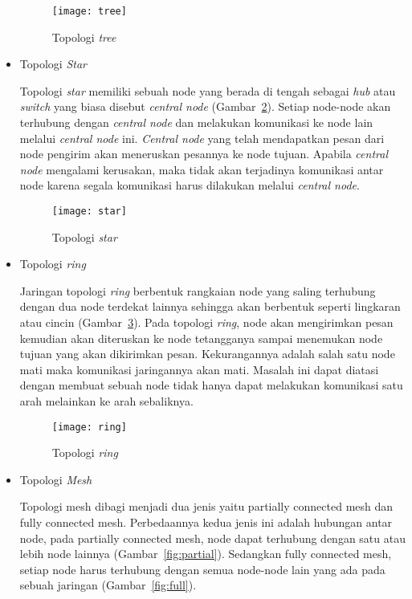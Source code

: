 \begin{itemize}
	\begin{figure}[H] 
		\centering  
		\texttt{[image: tree]}  
		\caption[Topologi \textit{tree}]{Topologi \textit{tree}}
		\label{fig:tree} 
	\end{figure}
	
	\item Topologi \textit{Star}
	
	Topologi \textit{star} memiliki sebuah node yang berada di tengah sebagai \textit{hub} atau \textit{switch} yang biasa disebut \textit{central node} (Gambar~\ref{fig:star}). Setiap node-node akan terhubung dengan \textit{central node} dan melakukan komunikasi ke node lain melalui \textit{central node} ini. \textit{Central node} yang telah mendapatkan pesan dari node pengirim akan meneruskan pesannya ke node tujuan. Apabila \textit{central node} mengalami kerusakan, maka tidak akan terjadinya komunikasi antar node karena segala komunikasi harus dilakukan melalui \textit{central node}.
	
	\begin{figure}[H] 
		\centering  
		\texttt{[image: star]}  
		\caption[Topologi \textit{star}]{Topologi \textit{star}}
		\label{fig:star} 
	\end{figure}
	
	\item Topologi \textit{ring}
	
	Jaringan topologi \textit{ring} berbentuk rangkaian node yang saling terhubung dengan dua node terdekat lainnya sehingga akan berbentuk seperti lingkaran atau cincin (Gambar~\ref{fig:ring}). Pada topologi \textit{ring}, node akan mengirimkan pesan kemudian akan diteruskan ke node tetangganya sampai menemukan node tujuan yang akan dikirimkan pesan. Kekurangannya adalah salah satu node mati maka komunikasi jaringannya akan mati. Masalah ini dapat diatasi dengan membuat sebuah node tidak hanya dapat melakukan komunikasi satu arah melainkan ke arah sebaliknya.
	
	\begin{figure}[H] 
		\centering  
		\texttt{[image: ring]}  
		\caption[Topologi \textit{ring}]{Topologi \textit{ring}}
		\label{fig:ring} 
	\end{figure}  
	
	\item Topologi \textit{Mesh}
	
	Topologi mesh dibagi menjadi dua jenis yaitu partially connected mesh dan fully connected mesh. Perbedaannya kedua jenis ini adalah hubungan antar node, pada partially connected mesh, node dapat terhubung dengan satu atau lebih node lainnya (Gambar~\ref{fig:partial}). Sedangkan fully connected mesh, setiap node harus terhubung dengan semua node-node lain yang ada pada sebuah jaringan (Gambar~\ref{fig:full}). 
	

\end{itemize}
